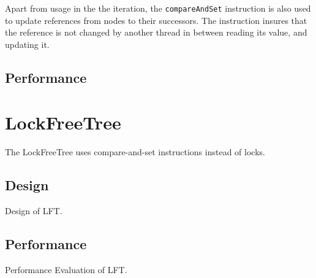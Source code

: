 \documentclass[a4paper]{article}
\begin{document}
Apart from usage in the the iteration, the \texttt{compareAndSet} instruction is also
used to update references from nodes to their successors. The instruction insures that
the reference is not changed by another thread in between reading its value, and
updating it.

\subsection{Performance}



\section{LockFreeTree}

The LockFreeTree uses compare-and-set instructions instead of locks.

\subsection{Design}

Design of LFT.

\subsection{Performance}

Performance Evaluation of LFT.
\end{document}
